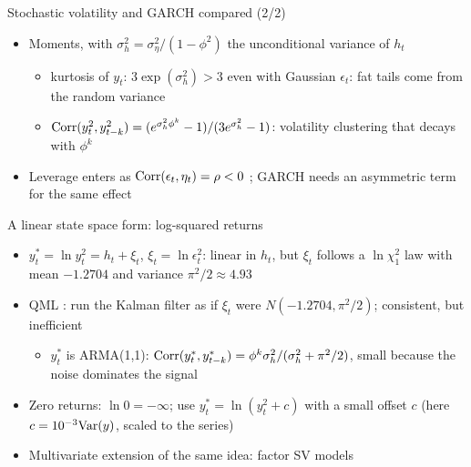\begin{frame}{Stochastic volatility and GARCH compared (2/2)}
\itemsize{\small}
\begin{itemize}
    \item Moments, with $\sigma^2_h = \sigma^2_\eta/(1 - \phi^2)$ the unconditional variance of $h_t$
    \begin{itemize}
        \item kurtosis of $y_t$: $3\exp(\sigma^2_h) > 3$ even with Gaussian $\epsilon_t$: fat tails come from the random variance
        \item $\text{Corr}(y^2_t, y^2_{t-k}) = (e^{\sigma^2_h\phi^k} - 1)/(3e^{\sigma^2_h} - 1)$: volatility clustering that decays with $\phi^k$
    \end{itemize}
    \item Leverage enters as $\text{Corr}(\epsilon_t, \eta_t) = \rho < 0$ ; GARCH needs an asymmetric term for the same effect
\end{itemize}
\end{frame}

\begin{frame}{A linear state space form: log-squared returns}
\itemsize{\small}
\begin{itemize}
    \item $y^*_t = \ln y^2_t = h_t + \xi_t$, $\xi_t = \ln\epsilon^2_t$: linear in $h_t$, but $\xi_t$ follows a $\ln\chi^2_1$ law with mean $-1.2704$ and variance $\pi^2/2 \approx 4.93$
    \item QML : run the Kalman filter as if $\xi_t$ were $N(-1.2704, \pi^2/2)$; consistent, but inefficient
    \begin{itemize}
        \item $y^*_t$ is ARMA(1,1): $\text{Corr}(y^*_t, y^*_{t-k}) = \phi^k\sigma^2_h/(\sigma^2_h + \pi^2/2)$, small because the noise dominates the signal
    \end{itemize}
    \item Zero returns: $\ln 0 = -\infty$; use $y^*_t = \ln(y^2_t + c)$ with a small offset $c$ (here $c = 10^{-3}\text{Var}(y)$, scaled to the series)
    \item Multivariate extension of the same idea: factor SV models 
\end{itemize}
\end{frame}

